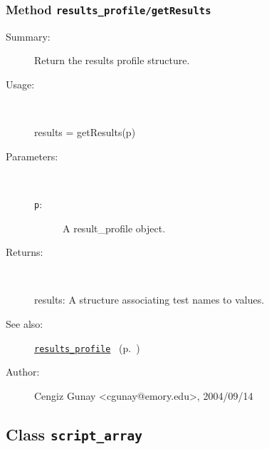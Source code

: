\subsubsection[Method \texttt{getResults}]{Method \texttt{results\_profile/getResults}}%
%
\label{ref_results_profile__getResults}%
\hypertarget{ref_results_profile__getResults}{}%
\begin{description}
\item[Summary:]Return the results profile structure.
%
\item[Usage:]~%
\begin{lyxcode}%
results = getResults(p)
%
\end{lyxcode}%
%
%
\item[Parameters:]~
\begin{description}%
\item[\texttt{p}:]
 A result\_profile object.
\end{description}%
%
\item[Returns:]~

	results: A structure associating test names to values.
%
%
\item[See also:]%
\hyperlink{ref_results_profile}{\texttt{results\_profile}}%
\ (p.~\pageref{ref_results_profile})%
%
%
\item[Author:]%
Cengiz Gunay <cgunay@emory.edu>, 2004/09/14%
\end{description}
\methodline%
\subsection{Class \texttt{script\_array}}%
%
\label{ref_script_array}%
\hypertarget{ref_script_array}{}%
